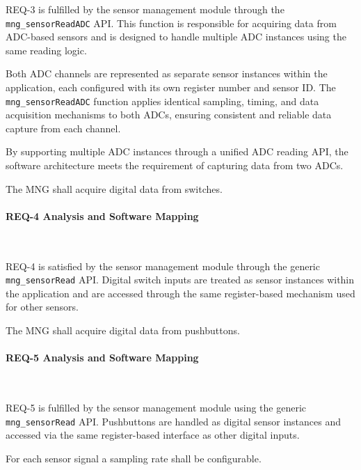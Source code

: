 REQ-3 is fulfilled by the sensor management module through the \texttt{mng\_sensorReadADC} 
API. This function is responsible for acquiring data from ADC-based sensors and is 
designed to handle multiple ADC instances using the same reading logic.

Both ADC channels are represented as separate sensor instances within the 
application, each configured with its own register number and sensor ID. The 
\texttt{mng\_sensorReadADC} function applies identical sampling, timing, and data acquisition 
mechanisms to both ADCs, ensuring consistent and reliable data capture from each 
channel.

By supporting multiple ADC instances through a unified ADC reading API, the software 
architecture meets the requirement of capturing data from two ADCs.


\begin{tcolorbox}[
    title=REQ-4,
    colback=gray!5,
    colframe=black,
    fonttitle=\bfseries
]
The MNG shall acquire digital data from switches.
\end{tcolorbox}

\paragraph{REQ-4 Analysis and Software Mapping}\

REQ-4 is satisfied by the sensor management module through the generic 
\texttt{mng\_sensorRead}  API. Digital switch inputs are treated as sensor instances within 
the application and are accessed through the same register-based mechanism used 
for other sensors.


\begin{tcolorbox}[
    title=REQ-5,
    colback=gray!5,
    colframe=black,
    fonttitle=\bfseries
]
The MNG shall acquire digital data from pushbuttons.
\end{tcolorbox}

\paragraph{REQ-5 Analysis and Software Mapping}\

REQ-5 is fulfilled by the sensor management module using the generic \texttt{mng\_sensorRead} 
API. Pushbuttons are handled as digital sensor instances and accessed via the 
same register-based interface as other digital inputs.


\begin{tcolorbox}[
    title=REQ-6,
    colback=gray!5,
    colframe=black,
    fonttitle=\bfseries
]
For each sensor signal a sampling rate shall be configurable.
\end{tcolorbox}

